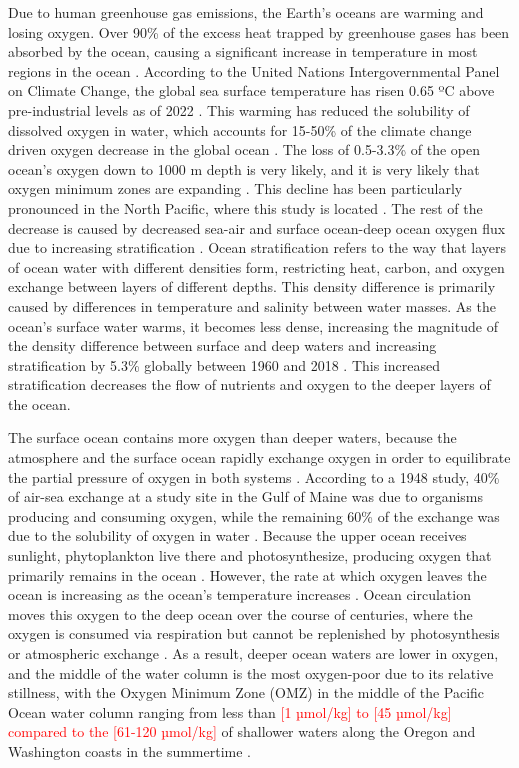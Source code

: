 \documentclass[12pt,twoside]{reedthesis}
\begin{document}
Due to human greenhouse gas emissions, the Earth's oceans are warming and losing oxygen. Over 90\% of the excess heat trapped by greenhouse gases has been absorbed by the ocean, causing a significant increase in temperature in most regions in the ocean \autocite{Bindoff2013}. According to the United Nations Intergovernmental Panel on Climate Change, the global sea surface temperature has risen 0.65 ºC above pre-industrial levels as of 2022 \autocite{Portner2019}. This warming has reduced the solubility of dissolved oxygen in water, which accounts for 15-50\% of the climate change driven oxygen decrease in the global ocean \autocite{Helm2011, Ito2017, Schmidtko2017}. The loss of 0.5-3.3\% of the open ocean's oxygen down to 1000 m depth is very likely, and it is very likely that oxygen minimum zones are expanding \autocite{Bindoff2013}. This decline has been particularly pronounced in the North Pacific, where this study is located \autocite{Bindoff2013, Ito2017}. The rest of the decrease is caused by decreased sea-air and surface ocean-deep ocean oxygen flux due to increasing stratification \autocite{Barth2024, Mancini2024, Portner2019}. Ocean stratification refers to the way that layers of ocean water with different densities form, restricting heat, carbon, and oxygen exchange between layers of different depths. This density difference is primarily caused by differences in temperature and salinity between water masses. As the ocean's surface water warms, it becomes less dense, increasing the magnitude of the density difference between surface and deep waters and increasing stratification by 5.3\% globally between 1960 and 2018 \autocite{Li2020a}. This increased stratification decreases the flow of nutrients and oxygen to the deeper layers of the ocean. 

The surface ocean contains more oxygen than deeper waters, because the atmosphere and the surface ocean rapidly exchange oxygen in order to equilibrate the partial pressure of oxygen in both systems \autocite{Ito2010}. According to a 1948 study, 40\% of air-sea exchange at a study site in the Gulf of Maine was due to organisms producing and consuming oxygen, while the remaining 60\% of the exchange was due to the solubility of oxygen in water \autocite{Redfield1948}. Because the upper ocean receives sunlight, phytoplankton live there and photosynthesize, producing oxygen that primarily remains in the ocean \autocite{Li2020}. However, the rate at which oxygen leaves the ocean is increasing as the ocean's temperature increases \autocite{Li2020}. Ocean circulation moves this oxygen to the deep ocean over the course of centuries, where the oxygen is consumed via respiration but cannot be replenished by photosynthesis or atmospheric exchange \autocite{Karstensen2008, Deutsch2024, Ito2010}. As a result, deeper ocean waters are lower in oxygen, and the middle of the water column is the most oxygen-poor due to its relative stillness, with the Oxygen Minimum Zone (OMZ) in the middle of the Pacific Ocean water column ranging from less than \textcolor{red}{ [1 µmol/kg] to [45 µmol/kg] compared to the  [61-120 µmol/kg]} of shallower waters along the Oregon and Washington coasts in the summertime \autocite{Karstensen2008, Deutsch2024, Barth2024, Pierce2012, Wyrtki1962}. 
\end{document}
